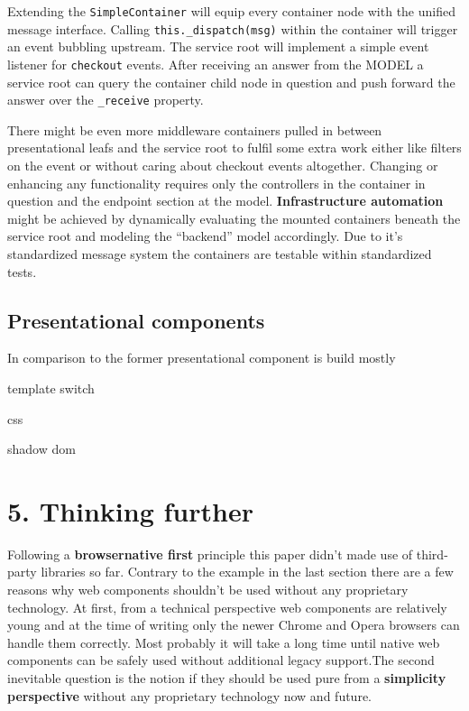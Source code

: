 \documentclass[]{article}
\begin{document}
Extending the \texttt{SimpleContainer} will equip every container node
with the unified message interface. Calling
\texttt{this.\_dispatch(msg)} within the container will trigger an event
bubbling upstream. The service root will implement a simple event
listener for \texttt{checkout} events. After receiving an answer from
the MODEL a service root can query the container child node in question
and push forward the answer over the \texttt{\_receive} property.

There might be even more middleware containers pulled in between
presentational leafs and the service root to fulfil some extra work
either like filters on the event or without caring about checkout events
altogether. Changing or enhancing any functionality requires only the
controllers in the container in question and the endpoint section at the
model. \textbf{Infrastructure automation} might be achieved by
dynamically evaluating the mounted containers beneath the service root
and modeling the ``backend'' model accordingly. Due to it's standardized
message system the containers are testable within standardized tests.

\subsection{Presentational components}\label{presentational-components}

In comparison to the former presentational component is build mostly

template switch

css

shadow dom

\section{5. Thinking further}\label{thinking-further}

Following a \textbf{browsernative first} principle this paper didn't
made use of third-party libraries so far. Contrary to the example in the
last section there are a few reasons why web components shouldn't be
used without any proprietary technology. At first, from a technical
perspective web components are relatively young and at the time of
writing only the newer Chrome and Opera browsers can handle them
correctly. Most probably it will take a long time until native web
components can be safely used without additional legacy support.The
second inevitable question is the notion if they should be used pure
from a \textbf{simplicity perspective} without any proprietary
technology now and future.
\end{document}
